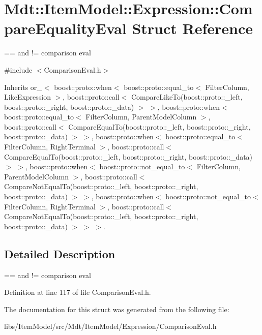 \hypertarget{struct_mdt_1_1_item_model_1_1_expression_1_1_compare_equality_eval}{}\section{Mdt\+:\+:Item\+Model\+:\+:Expression\+:\+:Compare\+Equality\+Eval Struct Reference}
\label{struct_mdt_1_1_item_model_1_1_expression_1_1_compare_equality_eval}


== and != comparison eval  




{\ttfamily \#include $<$Comparison\+Eval.\+h$>$}



Inherits or\+\_\+$<$ boost\+::proto\+::when$<$ boost\+::proto\+::equal\+\_\+to$<$ Filter\+Column, Like\+Expression $>$, boost\+::proto\+::call$<$ Compare\+Like\+To(boost\+::proto\+::\+\_\+left, boost\+::proto\+::\+\_\+right, boost\+::proto\+::\+\_\+data) $>$ $>$, boost\+::proto\+::when$<$ boost\+::proto\+::equal\+\_\+to$<$ Filter\+Column, Parent\+Model\+Column $>$, boost\+::proto\+::call$<$ Compare\+Equal\+To(boost\+::proto\+::\+\_\+left, boost\+::proto\+::\+\_\+right, boost\+::proto\+::\+\_\+data) $>$ $>$, boost\+::proto\+::when$<$ boost\+::proto\+::equal\+\_\+to$<$ Filter\+Column, Right\+Terminal $>$, boost\+::proto\+::call$<$ Compare\+Equal\+To(boost\+::proto\+::\+\_\+left, boost\+::proto\+::\+\_\+right, boost\+::proto\+::\+\_\+data) $>$ $>$, boost\+::proto\+::when$<$ boost\+::proto\+::not\+\_\+equal\+\_\+to$<$ Filter\+Column, Parent\+Model\+Column $>$, boost\+::proto\+::call$<$ Compare\+Not\+Equal\+To(boost\+::proto\+::\+\_\+left, boost\+::proto\+::\+\_\+right, boost\+::proto\+::\+\_\+data) $>$ $>$, boost\+::proto\+::when$<$ boost\+::proto\+::not\+\_\+equal\+\_\+to$<$ Filter\+Column, Right\+Terminal $>$, boost\+::proto\+::call$<$ Compare\+Not\+Equal\+To(boost\+::proto\+::\+\_\+left, boost\+::proto\+::\+\_\+right, boost\+::proto\+::\+\_\+data) $>$ $>$ $>$.



\subsection{Detailed Description}
== and != comparison eval 

Definition at line 117 of file Comparison\+Eval.\+h.



The documentation for this struct was generated from the following file\+:\begin{DoxyCompactItemize}
\item 
libs/\+Item\+Model/src/\+Mdt/\+Item\+Model/\+Expression/Comparison\+Eval.\+h\end{DoxyCompactItemize}
